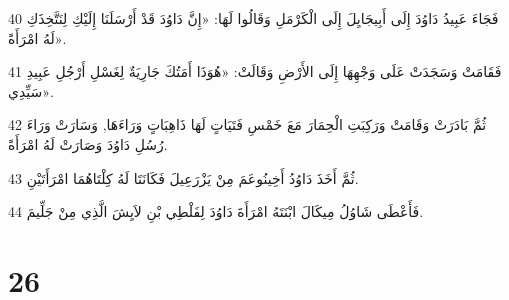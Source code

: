 \par 40 فَجَاءَ عَبِيدُ دَاوُدَ إِلَى أَبِيجَايِلَ إِلَى الْكَرْمَلِ وَقَالُوا لَهَا: «إِنَّ دَاوُدَ قَدْ أَرْسَلَنَا إِلَيْكِ لِنَتَّخِذَكِ لَهُ امْرَأَةً».
\par 41 فَقَامَتْ وَسَجَدَتْ عَلَى وَجْهِهَا إِلَى الأَرْضِ وَقَالَتْ: «هُوَذَا أَمَتُكَ جَارِيَةٌ لِغَسْلِ أَرْجُلِ عَبِيدِ سَيِّدِي».
\par 42 ثُمَّ بَادَرَتْ وَقَامَتْ وَرَكِبَتِ الْحِمَارَ مَعَ خَمْسِ فَتَيَاتٍ لَهَا ذَاهِبَاتٍ وَرَاءَهَا, وَسَارَتْ وَرَاءَ رُسُلِ دَاوُدَ وَصَارَتْ لَهُ امْرَأَةً.
\par 43 ثُمَّ أَخَذَ دَاوُدُ أَخِينُوعَمَ مِنْ يَزْرَعِيلَ فَكَانَتَا لَهُ كِلْتَاهُمَا امْرَأَتَيْنِ.
\par 44 فَأَعْطَى شَاوُلُ مِيكَالَ ابْنَتَهُ امْرَأَةَ دَاوُدَ لِفَلْطِي بْنِ لاَيِشَ الَّذِي مِنْ جَلِّيمَ.

\chapter{26}

